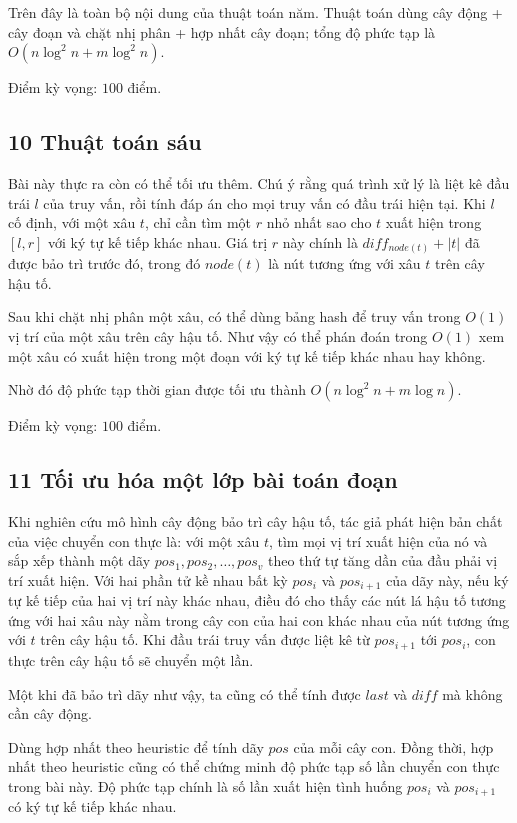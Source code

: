 \documentclass[11pt]{article}
\begin{document}
Trên đây là toàn bộ nội dung của thuật toán năm. Thuật toán dùng cây động + cây
đoạn và chặt nhị phân + hợp nhất cây đoạn; tổng độ phức tạp là
\(O(n\log^2 n + m\log^2 n)\).

Điểm kỳ vọng: \(100\) điểm.

\subsection*{10 Thuật toán sáu}

Bài này thực ra còn có thể tối ưu thêm. Chú ý rằng quá trình xử lý là liệt kê
đầu trái \(l\) của truy vấn, rồi tính đáp án cho mọi truy vấn có đầu trái hiện
tại. Khi \(l\) cố định, với một xâu \(t\), chỉ cần tìm một \(r\) nhỏ nhất sao
cho \(t\) xuất hiện trong \([l,r]\) với ký tự kế tiếp khác nhau. Giá trị \(r\)
này chính là \(diff_{node(t)}+\lvert t\rvert\) đã được bảo trì trước đó, trong
đó \(node(t)\) là nút tương ứng với xâu \(t\) trên cây hậu tố.

Sau khi chặt nhị phân một xâu, có thể dùng bảng hash để truy vấn trong \(O(1)\)
vị trí của một xâu trên cây hậu tố. Như vậy có thể phán đoán trong \(O(1)\) xem
một xâu có xuất hiện trong một đoạn với ký tự kế tiếp khác nhau hay không.

Nhờ đó độ phức tạp thời gian được tối ưu thành \(O(n\log^2 n + m\log n)\).

Điểm kỳ vọng: \(100\) điểm.

\subsection*{11 Tối ưu hóa một lớp bài toán đoạn}

Khi nghiên cứu mô hình cây động bảo trì cây hậu tố, tác giả phát hiện bản chất
của việc chuyển con thực là: với một xâu \(t\), tìm mọi vị trí xuất hiện của nó
và sắp xếp thành một dãy \(pos_1,pos_2,\ldots,pos_v\) theo thứ tự tăng dần của
đầu phải vị trí xuất hiện. Với hai phần tử kề nhau bất kỳ \(pos_i\) và
\(pos_{i+1}\) của dãy này, nếu ký tự kế tiếp của hai vị trí này khác nhau, điều
đó cho thấy các nút lá hậu tố tương ứng với hai xâu này nằm trong cây con của
hai con khác nhau của nút tương ứng với \(t\) trên cây hậu tố. Khi đầu trái truy
vấn được liệt kê từ \(pos_{i+1}\) tới \(pos_i\), con thực trên cây hậu tố sẽ
chuyển một lần.

Một khi đã bảo trì dãy như vậy, ta cũng có thể tính được \(last\) và \(diff\)
mà không cần cây động.

Dùng hợp nhất theo heuristic để tính dãy \(pos\) của mỗi cây con. Đồng thời,
hợp nhất theo heuristic cũng có thể chứng minh độ phức tạp số lần chuyển con
thực trong bài này. Độ phức tạp chính là số lần xuất hiện tình huống
\(pos_i\) và \(pos_{i+1}\) có ký tự kế tiếp khác nhau.
\end{document}
